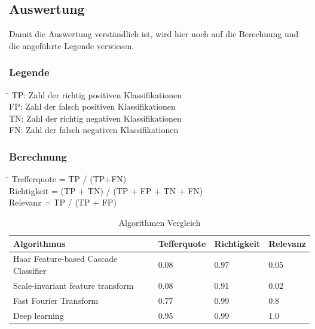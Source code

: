 \subsection{Auswertung}
Damit die Auswertung verständlich ist, wird hier noch auf die Berechnung und die angeführte Legende verwiesen.
\subsubsection{Legende}
\begin{tabbing}
    \hspace*{3cm}\=\hspace*{6cm}\= \kill
    TP:	\> Zahl der richtig positiven Klassifikationen\\
	FP:	\> Zahl der falsch positiven Klassifikationen\\
	TN:	\> Zahl der richtig negativen Klassifikationen\\
	FN:	\> Zahl der falsch negativen Klassifikationen\\
\end{tabbing}

\subsubsection{Berechnung}
\begin{tabbing}
    \hspace*{3cm}\=\hspace*{3cm}\=\hspace*{6cm}\= \kill
	Trefferquote \> = \> TP / (TP+FN)\\
	Richtigkeit \> = \> (TP + TN) / (TP + FP + TN + FN)\\
	Relevanz \> = \> TP / (TP + FP)\\
\end{tabbing}

\begin{table}[H]
	\centering
    \begin{tabular}{|l|l|l|l|}
    \hline    
    \rowcolor{lightblue}
	Algorithmus & Tefferquote & Richtigkeit & Relevanz \\ \hline
	Haar Feature-based Cascade Classifier & 0.08 & 0.97 & 0.05 \\ \hline
	Scale-invariant feature transform & 0.08 & 0.91 & 0.02 \\ \hline
	Fast Fourier Transform & 0.77 & 0.99 & 0.8 \\ \hline
	Deep learning & 0.95 & 0.99 & 1.0 \\ \hline
    \end{tabular}
    \caption[Algorithmen Vergleich]{Algorithmen Vergleich}
\end{table}

